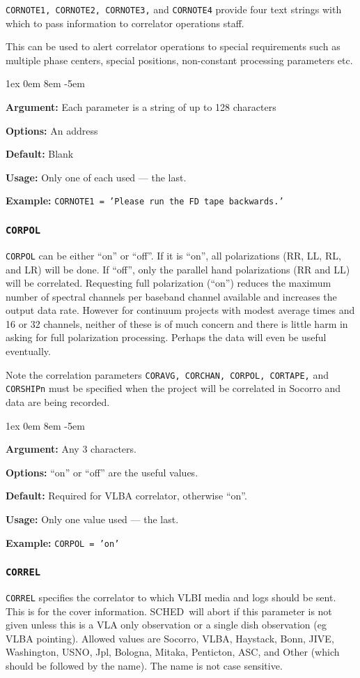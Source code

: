 \documentclass{report}
\newcommand{\schedb}{{\sc SCHED~}}
\newcommand{\rcwbox}[5]{
  \begin{list}{}{\parsep 1ex  \itemsep 0em
                 \leftmargin 8em  \itemindent -5em }
    \item {\bf Argument:} #1
    \item {\bf Options:}  #2
    \item {\bf Default:}  #3
    \item {\bf Usage:}    #4
    \item {\bf Example:}  #5
  \end{list}
}
\begin{document}
{\tt CORNOTE1, CORNOTE2, CORNOTE3,} and {\tt CORNOTE4} provide four
text strings with which to pass information to correlator operations
staff.

This can be used to alert correlator operations to special
requirements such as multiple phase centers, special positions,
non-constant processing parameters etc.

\rcwbox
{Each parameter is a string of up to 128 characters}
{An address}
{Blank}
{Only one of each used --- the last.}
{{\tt CORNOTE1 = 'Please run the FD tape backwards.' }}


\subsubsection{\label{MP:CORPOL}{\tt CORPOL}}

{\tt CORPOL} can be either ``on'' or ``off''.  If it is ``on'',
all polarizations (RR, LL, RL, and LR) will be done.  If ``off'',
only the parallel hand polarizations (RR and LL) will be correlated.
Requesting full polarization (``on'') reduces the maximum number
of spectral channels per baseband channel available and increases
the output data rate.  However for continuum projects with modest
average times and 16 or 32 channels, neither of these is of much
concern and there is little harm in asking for full polarization
processing.  Perhaps the data will even be useful eventually.

Note the correlation parameters {\tt CORAVG, CORCHAN,
CORPOL, CORTAPE,} and {\tt CORSHIPn} must be specified when
the project will be correlated in Socorro and data
are being recorded.

\rcwbox
{Any 3 characters.}
{``on'' or ``off'' are the useful values.}
{Required for VLBA correlator, otherwise ``on''.}
{Only one value used --- the last.}
{{\tt CORPOL = 'on'}}

\subsubsection{\label{MP:CORREL}{\tt CORREL}}

{\tt CORREL} specifies the correlator to which VLBI media and logs
should be sent. This is for the cover information.  \schedb will abort
if this parameter is not given unless this is a VLA only observation
or a single dish observation (eg VLBA pointing).  Allowed values are
Socorro, VLBA, Haystack, Bonn, JIVE, Washington, USNO, Jpl, Bologna,
Mitaka, Penticton, ASC,  and Other (which should be followed by the name).
The name is not case sensitive.
\end{document}
